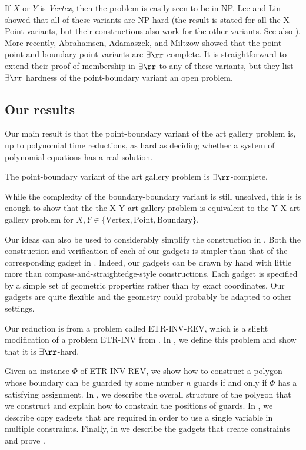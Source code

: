 If $X$ or $Y$ is \emph{Vertex}, then the problem is easily seen to be in NP. Lee and Lin \cite{NPHardness} showed that all of these variants are NP-hard (the result is stated for all the X-Point variants, but their constructions also work for the other variants. See also \cite{BoundaryNPHard}). More recently, Abrahamsen, Adamaszek, and Miltzow \cite{ExistsRHardness} showed that the point-point and boundary-point variants are $\exists\rr$ complete. It is straightforward to extend their proof of membership in $\exists\rr$ to any of these variants, but they list $\exists\rr$ hardness of the point-boundary variant an open problem.

\subsection{Our results}

Our main result is that the point-boundary variant of the art gallery problem is, up to polynomial time reductions, as hard as deciding whether a system of polynomial equations has a real solution.

\begin{theorem}\label{BGMain}
The point-boundary variant of the art gallery problem is $\exists\rr$-complete.
\end{theorem}

While the complexity of the boundary-boundary variant is still unsolved, this is is enough to show that the the X-Y art gallery problem is equivalent to the Y-X art gallery problem for $X, Y\in \{\text{Vertex}, \text{Point}, \text{Boundary}\}$. 

Our ideas can also be used to considerably simplify the construction in \cite{ExistsRHardness}. Both the construction and verification of each of our gadgets is simpler than that of the corresponding gadget in \cite{ExistsRHardness}. Indeed, our gadgets can be drawn by hand with little more than compass-and-straightedge-style constructions. Each gadget is specified by a simple set of geometric properties rather than by exact coordinates. Our gadgets are quite flexible and the geometry could probably be adapted to other settings.

Our reduction is from a problem called ETR-INV-REV, which is a slight modification of a problem ETR-INV from \cite{ExistsRHardness}. In , we define this problem and show that it is $\exists\rr$-hard. 

Given an instance $\Phi$ of ETR-INV-REV, we show how to construct a polygon whose boundary can be guarded by some number $n$ guards if and only if $\Phi$ has a satisfying assignment. In , we describe the overall structure of the polygon that we construct and explain how to constrain the positions of guards. In , we describe copy gadgets that are required in order to use a single variable in multiple constraints. Finally, in  we describe the gadgets that create constraints and prove .


